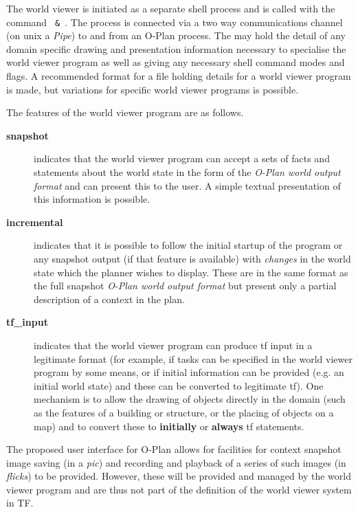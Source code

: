The world viewer is initiated as a separate shell process and is called with
the command {\tt {}
 \& }.  The process is connected via a
two way communications channel (on {\sc unix} a {\em Pipe}) to and from an
O-Plan process.  The  may hold the
detail of any domain specific drawing and presentation information necessary
to specialise the world viewer program as well as giving any necessary shell
command modes and flags.  A recommended format for a file holding details for
a world viewer program is made, but variations for specific world viewer
programs is possible.

The features of the world viewer program are as follows.

\begin{description}

\item[{\bf snapshot}]
indicates that the world viewer program can accept a sets of facts and
statements about the world state in the form of the {\em O-Plan world
output format} and can present this to the user.  A simple textual
presentation of this information is possible. 

\item[{\bf incremental}]
indicates that it is possible to follow the initial startup of the program or
any snapshot output (if that feature is available) with {\em changes} in the
world state which the planner wishes to display.  These are in the same format
as the full snapshot {\em O-Plan world output format} but present only a
partial description of a context in the plan.

\item[{\bf tf\_input}]
indicates that the world viewer program can produce {\sc tf} input in a
legitimate format (for example, if tasks can be specified in the
world viewer program by some means, or if initial information can be
provided (e.g.  an initial world state) and these can be converted to
legitimate {\sc tf}).  One mechanism is to allow the drawing of objects
directly in the domain (such as the features of a building or structure,
or the placing of objects on a map) and to convert these to {\bf
initially} or {\bf always} {\sc tf} statements. 

\end{description}

The proposed user interface for O-Plan allows for facilities for
context snapshot image saving (in a {\em pic}) and recording and playback
of a series of such images (in {\em flicks}) to be provided.  However, these
will be provided and managed by the world viewer program and are thus not part
of the definition of the world viewer system in TF.

